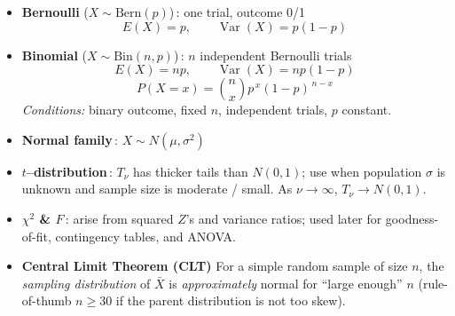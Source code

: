 \documentclass[12pt]{book}
\begin{document}

\newpage
\pagestyle{fancy}

\begin{itemize}

\item \textbf{Bernoulli} ($X\sim\text{Bern}(p)$)\,: one trial, outcome 0/1
      \[
        E(X)=p, \qquad \operatorname{Var}(X)=p(1-p)
      \]

\item \textbf{Binomial} ($X\sim\text{Bin}(n,p)$)\,: $n$ independent Bernoulli trials
      \[
        E(X)=np, \qquad \operatorname{Var}(X)=np(1-p)
      \]
      \[
        P(X=x)=\binom{n}{x}p^{\,x}(1-p)^{\,n-x}
      \]
      \textit{Conditions:} binary outcome, fixed $n$, independent trials, $p$ constant.

\item \textbf{Normal family}\,: $X\sim N(\mu,\sigma^2)$  

\item \textbf{$t$–distribution}\,: $T_\nu$ has thicker tails than $N(0,1)$;  
      use when population $\sigma$ is unknown and sample size is moderate / small.  
      As $\nu\to\infty$, $T_\nu\to N(0,1)$.

\item \textbf{$\chi^2$ \& $F$}\,: arise from squared $Z$’s and variance ratios;  
      used later for goodness-of-fit, contingency tables, and ANOVA.

\item \textbf{Central Limit Theorem (CLT)}  
      For a simple random sample of size $n$, the \emph{sampling distribution}
      of $\bar{X}$ is \emph{approximately} normal for “large enough” $n$
      (rule-of-thumb $n\ge 30$ if the parent distribution is not too skew).


\end{itemize}
\end{document}
